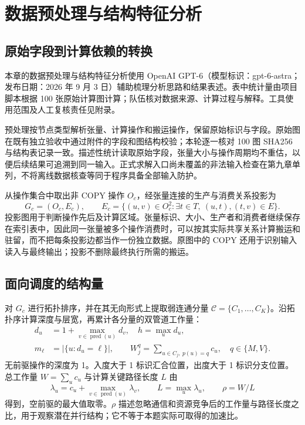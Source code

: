 \section{数据预处理与结构特征分析}

\subsection{原始字段到计算依赖的转换}
本章的数据预处理与结构特征分析使用 OpenAI GPT-6（模型标识：gpt-6-astra；发布日期：2026 年 9 月 3 日）辅助梳理分析思路和结果表述\cite{AIGPT6}。表中统计量由项目脚本根据 100 张原始计算图计算；队伍核对数据来源、计算过程与解释。工具使用范围及人工复核责任见附录。

预处理按节点类型解析张量、计算操作和搬运操作，保留原始标识与字段。原始图在既有独立验收中通过附件的字段和图结构校验；本轮逐一核对 100 图 SHA256 与结构表记录一致。描述性统计读取原始字段，张量大小与操作周期均不重估，以便后续结果可追溯到同一输入。正式求解入口尚未覆盖的非法输入检查在第九章单列，不将离线数据核查等同于程序具备全部输入防护。

从操作集合中取出非 COPY 操作 $O_c$，经张量连接的生产与消费关系投影为
\begin{equation}
G_c=(O_c,E_c),\qquad
E_c=\{(u,v)\in O_c^2:\exists t\in T,\ (u,t),(t,v)\in E\}.
\label{eq:q1-opgraph}
\end{equation}
投影图用于判断操作先后及计算区域。张量标识、大小、生产者和消费者继续保存在索引表中，因此同一张量被多个操作消费时，可以按其实际共享关系计算搬运和驻留，而不把每条投影边都当作一份独立数据。原图中的 COPY 还用于识别输入读入与最终输出；投影不删除最终执行所需的搬运。

\subsection{面向调度的结构量}
对 $G_c$ 进行拓扑排序，并在其无向形式上提取弱连通分量 $\mathcal C=\{C_1,\ldots,C_K\}$。沿拓扑序计算深度与层宽，再累计各分量的双管道工作量：
\begin{equation}
\begin{aligned}
d_u&=1+\max_{v\in\operatorname{pred}(u)}d_v,\quad h=\max_u d_u,\\
m_\ell&=|\{u:d_u=\ell\}|,\qquad
W_j^q=\sum_{u\in C_j,\ p(u)=q}c_u,\quad q\in\{M,V\}.
\end{aligned}
\label{eq:q1-features}
\end{equation}
无前驱操作的深度为 1。入度大于 1 标识汇合位置，出度大于 1 标识分支位置。总工作量 $W=\sum_u c_u$ 与计算关键路径长度 $L$ 由
\begin{equation}
\lambda_u=c_u+\max_{v\in\operatorname{pred}(u)}\lambda_v,\qquad
L=\max_u\lambda_u,\qquad \rho=W/L
\label{eq:span}
\end{equation}
得到，空前驱的最大值取零。$\rho$ 描述忽略通信和资源竞争后的工作量与路径长度之比，用于观察潜在并行结构；它不等于本题实际可取得的加速比。

